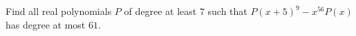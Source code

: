 Find all real polynomials $P$ of degree at least $7$ such that $P(x+5)^9-x^{56}P(x)$ has degree at most $61$.
